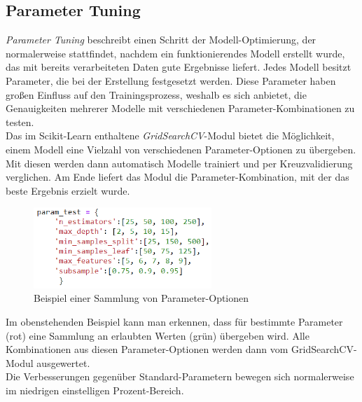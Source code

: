 \subsection{Parameter Tuning}
\textit{Parameter Tuning} beschreibt einen Schritt der Modell-Optimierung, der normalerweise stattfindet, 
nachdem ein funktionierendes Modell erstellt wurde, das mit bereits verarbeiteten Daten gute Ergebnisse liefert.
Jedes Modell besitzt Parameter, die bei der Erstellung festgesetzt werden. Diese Parameter haben 
großen Einfluss auf den Trainingsprozess, weshalb es sich anbietet, die Genauigkeiten mehrerer Modelle 
mit verschiedenen Parameter-Kombinationen zu testen.\\
Das im Scikit-Learn enthaltene \textit{GridSearchCV}-Modul
bietet die Möglichkeit, einem Modell eine Vielzahl von verschiedenen Parameter-Optionen zu übergeben. Mit diesen 
werden dann automatisch Modelle trainiert und per Kreuzvalidierung verglichen. Am Ende liefert das Modul 
die Parameter-Kombination, mit der das beste Ergebnis erzielt wurde.

\begin{figure}[h]
    \centering
    \includegraphics[width=0.6\textwidth]{pic/param_test.png}
    \caption{Beispiel einer Sammlung von Parameter-Optionen}
    \label{fig:Param_Test}
\end{figure}

Im obenstehenden Beispiel kann man erkennen, dass für bestimmte Parameter (rot) eine Sammlung an erlaubten 
Werten (grün) übergeben wird. Alle Kombinationen aus diesen Parameter-Optionen werden dann vom 
GridSearchCV-Modul ausgewertet.\\
Die Verbesserungen gegenüber Standard-Parametern bewegen sich normalerweise im niedrigen einstelligen 
Prozent-Bereich.

